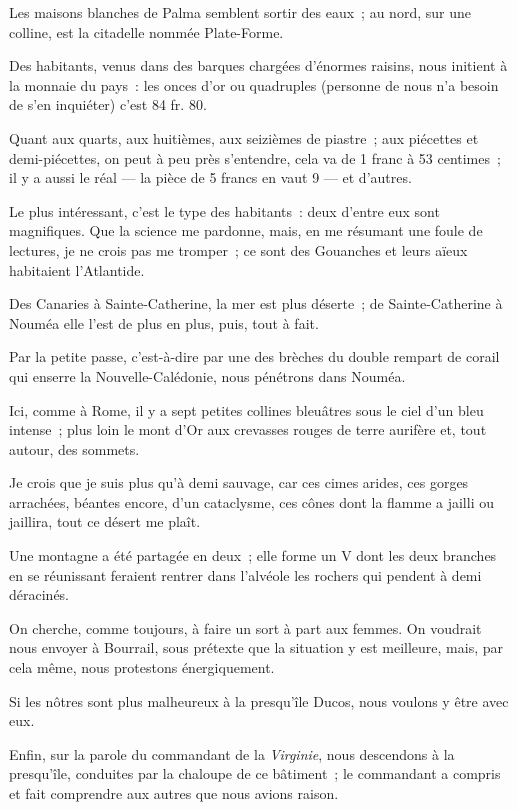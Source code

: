 \documentclass[french,twoside]{book} %
\begin{document}
Les maisons blanches de Palma semblent sortir des eaux ; au nord, sur une colline, est la citadelle nommée Plate-Forme.\par
Des habitants, venus dans des barques chargées d’énormes raisins, nous initient à la monnaie du pays : les onces d’or ou quadruples (personne de nous n’a besoin de s’en inquiéter) c’est 84 fr. 80.\par
Quant aux quarts, aux huitièmes, aux seizièmes de piastre ; aux piécettes et demi-piécettes, on peut à peu près s’entendre, cela va de 1 franc à 53 centimes ; il y a aussi le réal — la pièce de 5 francs en vaut 9 — et d’autres.\par
Le plus intéressant, c’est le type des habitants : deux d’entre eux sont magnifiques. Que la science  me pardonne, mais, en me résumant une foule de lectures, je ne crois pas me tromper ; ce sont des Gouanches et leurs aïeux habitaient l’Atlantide.\par
Des Canaries à Sainte-Catherine, la mer est plus déserte ; de Sainte-Catherine à Nouméa elle l’est de plus en plus, puis, tout à fait.\par
Par la petite passe, c’est-à-dire par une des brèches du double rempart de corail qui enserre la Nouvelle-Calédonie, nous pénétrons dans Nouméa.\par
Ici, comme à Rome, il y a sept petites collines bleuâtres sous le ciel d’un bleu intense ; plus loin le mont d’Or aux crevasses rouges de terre aurifère et, tout autour, des sommets.\par
Je crois que je suis plus qu’à demi sauvage, car ces cimes arides, ces gorges arrachées, béantes encore, d’un cataclysme, ces cônes dont la flamme a jailli ou jaillira, tout ce désert me plaît.\par
Une montagne a été partagée en deux ; elle forme un V dont les deux branches en se réunissant feraient rentrer dans l’alvéole les rochers qui pendent à demi déracinés.\par
On cherche, comme toujours, à faire un sort à part aux femmes. On voudrait nous envoyer à Bourrail, sous prétexte que la situation y est  meilleure, mais, par cela même, nous protestons énergiquement.\par
Si les nôtres sont plus malheureux à la presqu’île Ducos, nous voulons y être avec eux.\par
Enfin, sur la parole du commandant de la \emph{Virginie}, nous descendons à la presqu’île, conduites par la chaloupe de ce bâtiment ; le commandant a compris et fait comprendre aux autres que nous avions raison.\par
\end{document}
